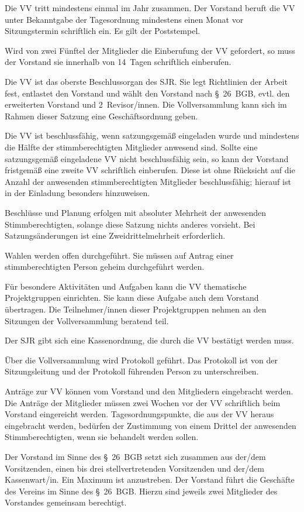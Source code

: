 \documentclass[10pt,a4paper,oneside,parskip=half]{scrartcl}
\begin{document}
\begin{contract}
Die VV tritt mindestens einmal im Jahr zusammen. Der Vorstand beruft die VV unter Bekanntgabe der Tagesordnung mindestens einen Monat vor Sitzungstermin schriftlich ein. Es gilt der Poststempel.

Wird von zwei Fünftel der Mitglieder die Einberufung der VV gefordert, so muss der Vorstand sie innerhalb von 14~Tagen schriftlich einberufen.

Die VV ist das oberste Beschlussorgan des SJR. Sie legt Richtlinien der Arbeit fest, entlastet den Vorstand und wählt den Vorstand nach §~26~BGB, evtl. den erweiterten Vorstand und 2~Revisor/innen. Die Vollversammlung kann sich im Rahmen dieser Satzung eine Geschäftsordnung geben.

Die VV ist beschlussfähig, wenn satzungsgemäß eingeladen wurde und mindestens die Hälfte der stimmberechtigten Mitglieder anwesend sind. Sollte eine satzungsgemäß eingeladene VV nicht beschlussfähig sein, so kann der Vorstand fristgemäß eine zweite VV schriftlich einberufen. Diese ist ohne Rücksicht auf die Anzahl der anwesenden stimmberechtigten Mitglieder beschlussfähig; hierauf ist in der Einladung besonders hinzuweisen.

Beschlüsse und Planung erfolgen mit absoluter Mehrheit der anwesenden Stimmberechtigten, solange diese Satzung nichts anderes vorsieht. Bei Satzungsänderungen ist eine Zweidrittelmehrheit erforderlich.

Wahlen werden offen durchgeführt. Sie müssen auf Antrag einer stimmberechtigten Person geheim durchgeführt werden.

Für besondere Aktivitäten und Aufgaben kann die VV thematische Projektgruppen einrichten. Sie kann diese Aufgabe auch dem Vorstand übertragen. Die Teilnehmer/innen dieser Projektgruppen nehmen an den Sitzungen der Vollversammlung beratend teil.

Der SJR gibt sich eine Kassenordnung, die durch die VV bestätigt werden muss.

Über die Vollversammlung wird Protokoll geführt. Das Protokoll ist von der Sitzungsleitung und der Protokoll führenden Person zu unterschreiben.

Anträge zur VV können vom Vorstand und den Mitgliedern eingebracht werden. Die Anträge der Mitglieder müssen zwei Wochen vor der VV schriftlich beim Vorstand eingereicht werden. Tagesordnungspunkte, die aus der VV heraus eingebracht werden, bedürfen der Zustimmung von einem Drittel der anwesenden Stimmberechtigten, wenn sie behandelt werden sollen.

Der Vorstand im Sinne des §~26~BGB setzt sich zusammen aus der/dem Vorsitzenden, einen bis drei stellvertretenden Vorsitzenden und der/dem Kassenwart/in. Ein Maximum ist anzustreben. Der Vorstand führt die Geschäfte des Vereins im Sinne des §~26~BGB. Hierzu sind jeweils zwei Mitglieder des Vorstandes gemeinsam berechtigt.


\end{contract}
\end{document}
